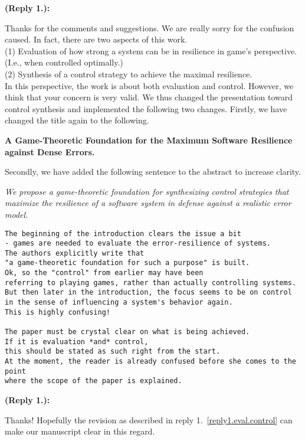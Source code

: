 \documentclass[times,10pt,twocolumn]{article}
\newcounter{cabbage0}
\newcounter{cabbage1}
\newcounter{cabbage2}
\newcounter{cabbage3}
\newcounter{bean0}
\newcounter{bean1}
\newcounter{bean2}
\newcounter{bean3}
\newcounter{bean4}
\newcounter{bean5}
\newcounter{bean6}
\newenvironment{reply1}{\begin{list}{\bf (Reply 1.\arabic{bean1}):} 
        {\usecounter{bean1}\setcounter{bean1}{\value{cabbage1}} \item \setcounter{cabbage1}{\value{bean1}} 
        }
}{\end{list}}
\begin{document}
\begin{reply1} \label{reply1.eval.control} 
Thanks for the comments and suggestions.  
We are really sorry for the confusion caused. 
In fact, there are two aspects of this work. \\
(1) Evaluation of how strong a system can be in resilience in game's perspective. (I.e., when controlled optimally.) \\
(2) Synthesis of a control strategy to achieve the maximal resilience.  \\
In this perspective, the work is about both evaluation and control.  
However, we think that your concern is very valid.  
We thus changed the presentation toward control synthesis and implemented the 
following two changes. 
Firstly, we have changed the title again to the following. 
\begin{center} \bf 
A Game-Theoretic Foundation for the Maximum Software Resilience against Dense Errors.
\end{center} 
Secondly, we have added the following sentence to the abstract to increase clarity.
\begin{center} 
\parbox{140mm}{\em 
We propose a game-theoretic foundation for synthesizing control strategies 
that maximize the resilience of a software system in defense against a
realistic error model.  
}
\end{center} 
\end{reply1} 
\begin{verbatim} 
The beginning of the introduction clears the issue a bit 
- games are needed to evaluate the error-resilience of systems. 
The authors explicitly write that 
"a game-theoretic foundation for such a purpose" is built. 
Ok, so the "control" from earlier may have been 
referring to playing games, rather than actually controlling systems. 
But then later in the introduction, the focus seems to be on control 
in the sense of influencing a system's behavior again. 
This is highly confusing! 

The paper must be crystal clear on what is being achieved. 
If it is evaluation *and* control, 
this should be stated as such right from the start. 
At the moment, the reader is already confused before she comes to the point 
where the scope of the paper is explained. 
\end{verbatim} 
\begin{reply1} 
Thanks!
Hopefully the revision as described in reply 1.~\ref{reply1.eval.control} 
can make our manuscript clear in this regard. 
\end{reply1} 
\end{document}
